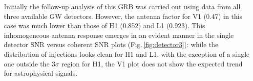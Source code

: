 \documentclass[binding=0.6cm, LaM]{sapthesis}
\begin{document}
	Initially the follow-up analysis of this GRB was carried out using data from all three available GW detectors.
        However, the antenna factor for V1 (0.47) in this case was much lower than those of H1 (0.852) and L1 (0.923).
        This inhomogeneous antenna response emerges in an evident manner in the  single detector SNR versus coherent SNR plots (Fig.\,\ref{fig:detector3}):
        while the distribution of injections looks clean for H1 and L1, with the exception of a single one outside the $3 \sigma$ region for H1,
        the V1 plot does not show the expected trend for astrophysical signals.
        \begin{figure}[!t]
          \noindent
          \label{detector3}

\end{figure}
\end{document}
